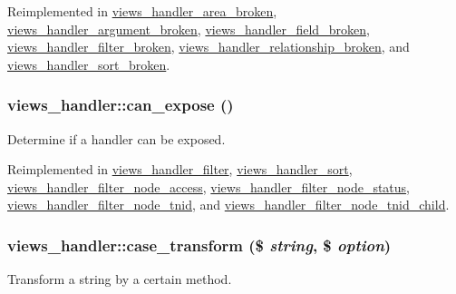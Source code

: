Reimplemented in \hyperlink{classviews__handler__area__broken_ab7a2b86712be49f469134c315e8907ef}{views\_\-handler\_\-area\_\-broken}, \hyperlink{classviews__handler__argument__broken_afb6937305424b7b8a2e6fb9e3d4ef1fb}{views\_\-handler\_\-argument\_\-broken}, \hyperlink{classviews__handler__field__broken_af579634a7ec51fa709d7c0cddc135725}{views\_\-handler\_\-field\_\-broken}, \hyperlink{classviews__handler__filter__broken_a912a78cd8ee1d5c139613d252f2ca9e1}{views\_\-handler\_\-filter\_\-broken}, \hyperlink{classviews__handler__relationship__broken_ac4e5826e70953e7ec16f50ec264fdb53}{views\_\-handler\_\-relationship\_\-broken}, and \hyperlink{classviews__handler__sort__broken_a082f810e9181d6b2f878013897e3cc17}{views\_\-handler\_\-sort\_\-broken}.\hypertarget{classviews__handler_a92517d122d69dc6f64a9edb80d55057d}{
\subsubsection[{can\_\-expose}]{\setlength{\rightskip}{0pt plus 5cm}views\_\-handler::can\_\-expose ()}}
\label{classviews__handler_a92517d122d69dc6f64a9edb80d55057d}
Determine if a handler can be exposed. 

Reimplemented in \hyperlink{classviews__handler__filter_af0e5810a2a2f194cd6af0fca9c858756}{views\_\-handler\_\-filter}, \hyperlink{classviews__handler__sort_aff131cfa9cf414c127c35ee655ee9e76}{views\_\-handler\_\-sort}, \hyperlink{classviews__handler__filter__node__access_a20eacba1b9be3c0e6b8245191b60a9ff}{views\_\-handler\_\-filter\_\-node\_\-access}, \hyperlink{classviews__handler__filter__node__status_adaece4fdfbc098bb12b83a7cae193cc3}{views\_\-handler\_\-filter\_\-node\_\-status}, \hyperlink{classviews__handler__filter__node__tnid_a9e6111d77af1aefee0b78d7b3b2c25cc}{views\_\-handler\_\-filter\_\-node\_\-tnid}, and \hyperlink{classviews__handler__filter__node__tnid__child_a2c6527f01666eaf0ba38eff4798ec732}{views\_\-handler\_\-filter\_\-node\_\-tnid\_\-child}.\hypertarget{classviews__handler_a49a14d85598b7f8d70a339e656ce9514}{
\subsubsection[{case\_\-transform}]{\setlength{\rightskip}{0pt plus 5cm}views\_\-handler::case\_\-transform (\$ {\em string}, \/  \$ {\em option})}}
\label{classviews__handler_a49a14d85598b7f8d70a339e656ce9514}
Transform a string by a certain method.


